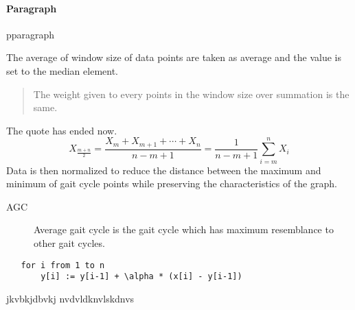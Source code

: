 \documentclass[a4paper]{report}
\begin{document}
\paragraph{Paragraph}
pparagraph

The average of window size of data points are taken as average and the value is set to the median element. 
\begin{quote}The weight given to every points in the window size over summation is the same.
\end{quote}The quote has ended now.
$$X_\frac{m+n}{2} = \frac{X_m + X_{m+1}+ \cdots + X_n}{n-m+1}
      = \frac{1}{n-m+1}\sum_{i=m}^{n} X_i$$
Data is then normalized to reduce the distance between the maximum and minimum of 
gait cycle points while preserving the characteristics of the graph.\newline

\begin{description}
	\item[AGC] Average gait cycle is the gait cycle which has maximum resemblance to other gait cycles.
\end{description}

\begin{verbatim}
   for i from 1 to n
       y[i] := y[i-1] + \alpha * (x[i] - y[i-1])
\end{verbatim}
\begin{thebibliography}{20}
jkvbkjdbvkj
nvdvldknvlskdnvs
\end{thebibliography}
\end{document}
